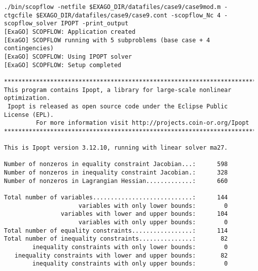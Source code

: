 \begin{lstlisting}
./bin/scopflow -netfile $EXAGO_DIR/datafiles/case9/case9mod.m -ctgcfile $EXAGO_DIR/datafiles/case9/case9.cont -scopflow_Nc 4 -scopflow_solver IPOPT -print_output 
[ExaGO] SCOPFLOW: Application created
[ExaGO] SCOPFLOW running with 5 subproblems (base case + 4 contingencies)
[ExaGO] SCOPFLOW: Using IPOPT solver
[ExaGO] SCOPFLOW: Setup completed

******************************************************************************
This program contains Ipopt, a library for large-scale nonlinear optimization.
 Ipopt is released as open source code under the Eclipse Public License (EPL).
         For more information visit http://projects.coin-or.org/Ipopt
******************************************************************************

This is Ipopt version 3.12.10, running with linear solver ma27.

Number of nonzeros in equality constraint Jacobian...:      598
Number of nonzeros in inequality constraint Jacobian.:      328
Number of nonzeros in Lagrangian Hessian.............:      660

Total number of variables............................:      144
                     variables with only lower bounds:        0
                variables with lower and upper bounds:      104
                     variables with only upper bounds:        0
Total number of equality constraints.................:      114
Total number of inequality constraints...............:       82
        inequality constraints with only lower bounds:        0
   inequality constraints with lower and upper bounds:       82
        inequality constraints with only upper bounds:        0


\end{lstlisting}

